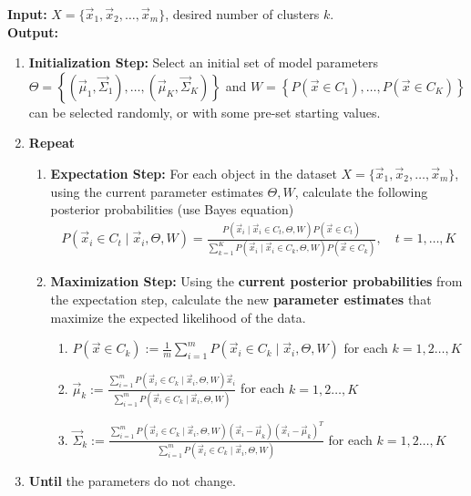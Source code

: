 \documentclass[11pt]{elegantbook}
\begin{document}
\begin{definition}\normalfont
\textbf{Input:} $X=\{\vec{x}_1, \vec{x}_2, \ldots, \vec{x}_m\}$, desired number of clusters $k$.\\
\textbf{Output:} 
\begin{enumerate}[$\bullet$]
    \item \textbf{Initialization Step:} Select an initial set of model parameters\\
    $\Theta=\left\{\left(\vec{\mu}_1, \vec{\Sigma}_1\right), \ldots,\left(\vec{\mu}_K, \vec{\Sigma}_K\right)\right\}$ and $W=\left\{P\left(\vec{x} \in C_1\right), \ldots, P\left(\vec{x} \in C_K\right)\right\}$ can be selected randomly, or with some pre-set starting values.
    \item \textbf{Repeat}
    \begin{enumerate}
        \item \textbf{Expectation Step:} For each object in the dataset $X=\{\vec{x}_1, \vec{x}_2, \ldots, \vec{x}_m\}$, using the current parameter estimates $\Theta, W$, calculate the following posterior probabilities (use Bayes equation)
        \begin{equation}
            \begin{aligned}
                P\left(\vec{x}_i \in C_t \mid \vec{x}_i, \Theta, W\right)=\frac{P\left(\vec{x}_i \mid \vec{x}_i \in C_t, \Theta, W\right) P\left(\vec{x} \in C_t\right)}{\sum_{k=1}^K P\left(\vec{x}_i \mid \vec{x}_i \in C_k, \Theta, W\right) P\left(\vec{x} \in C_k\right)},\quad t=1,\dots,K
            \end{aligned}
            \nonumber
        \end{equation}
        \item \textbf{Maximization Step:} Using the \textbf{current posterior probabilities} from the expectation step, calculate the new \textbf{parameter estimates} that maximize the expected likelihood of the data.
        \begin{enumerate}[$\circ$]
            \item $P\left(\vec{x} \in C_k\right):=\frac{1}{m} \sum_{i=1}^m P\left(\vec{x}_i \in C_{k} \mid \vec{x}_i, \Theta, W\right)$ for each $k=1,2 \ldots, K$
            \item $\vec{\mu}_k:=\frac{\sum_{i=1}^m P\left(\vec{x}_i \in C_k \mid \vec{x}_i, \Theta, W\right) \vec{x}_i}{\sum_{i=1}^m P\left(\vec{x}_i \in C_k \mid \vec{x}_i, \Theta, W\right)}$ for each $k=1,2 \ldots, K$
            \item $\vec{\Sigma}_k:=\frac{\sum_{i=1}^m P\left(\vec{x}_i \in C_k \mid \vec{x}_i, \Theta, W\right)\left(\vec{x}_i-\vec{\mu}_k\right)\left(\vec{x}_i-\vec{\mu}_k\right)^T}{\sum_{i=1}^m P\left(\vec{x}_i \in C_k \mid \vec{x}_i, \Theta, W\right)}$ for each $k=1,2 \ldots, K$
        \end{enumerate}
    \end{enumerate}
    \item \textbf{Until} the parameters do not change.
\end{enumerate}
\end{definition}
\end{document}
